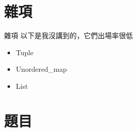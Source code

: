 \documentclass[mathserif]{beamer}
\begin{document}
\section{雜項}

\begin{frame}{雜項}
    以下是我沒講到的，它們出場率很低
    \begin{itemize}
        \item Tuple
        \item Unordered\_map
        \item List
    \end{itemize}
\end{frame}

\section{題目}
\end{document}
